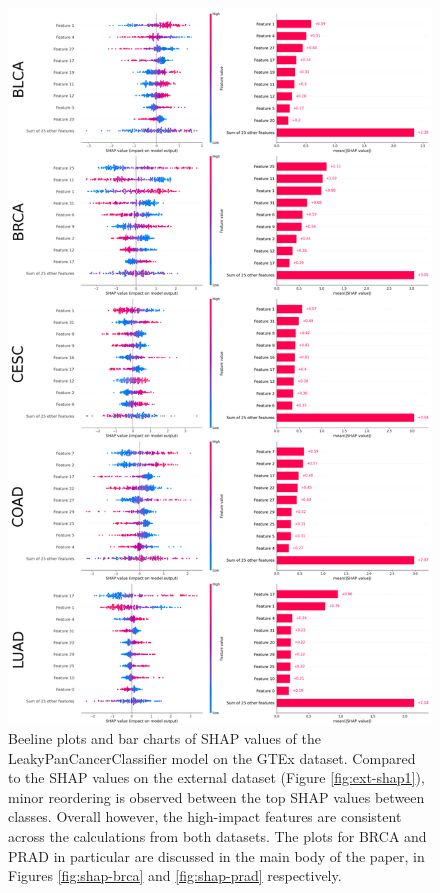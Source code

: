 \documentclass{l4proj}
\begin{document}
\begin{appendices}
\begin{figure}
    \centering
    \includegraphics[width=.85\linewidth]{images/gtex_shap1.png}
    \caption{Beeline plots and bar charts of SHAP values of the LeakyPanCancerClassifier model on the GTEx dataset. Compared to the SHAP values on the external dataset (Figure \ref{fig:ext-shap1}), minor reordering is observed between the top SHAP values between classes. Overall however, the high-impact features are consistent across the calculations from both datasets. The plots for BRCA and PRAD in particular are discussed in the main body of the paper, in Figures \ref{fig:shap-brca} and \ref{fig:shap-prad} respectively.}
    \label{fig:gtex-shap1}
\end{figure}


\end{appendices}
\end{document}
